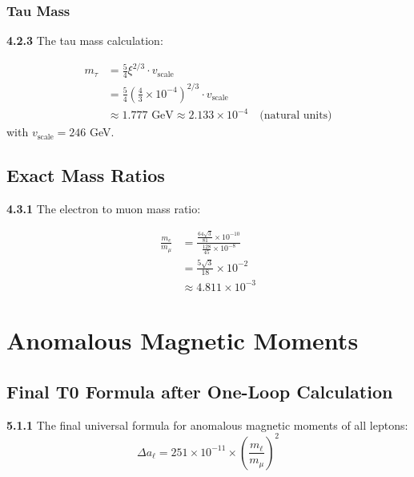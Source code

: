 \documentclass[12pt,a4paper]{article}
\newcommand{\xipar}{\xi}
\begin{document}
	\subsubsection{Tau Mass}
	
	\noindent \textbf{4.2.3} The tau mass calculation:
	\begin{keyresult}
		\begin{align}
			m_\tau &= \frac{5}{4} \xipar^{2/3} \cdot v_{\text{scale}} \\
			&= \frac{5}{4} \left( \frac{4}{3} \times 10^{-4} \right)^{2/3} \cdot v_{\text{scale}} \\
			&\approx 1.777 \text{ GeV} \approx 2.133 \times 10^{-4} \quad \text{(natural units)}
		\end{align}
		with $v_{\text{scale}} = 246$ GeV.
	\end{keyresult}
	
	\subsection{Exact Mass Ratios}
	
	\noindent \textbf{4.3.1} The electron to muon mass ratio:
	\begin{keyresult}
		\begin{align}
			\frac{m_e}{m_\mu} &= \frac{\frac{64 \sqrt{3}}{81} \times 10^{-10}}{\frac{128}{45} \times 10^{-8}} \\
			&= \frac{5 \sqrt{3}}{18} \times 10^{-2} \\
			&\approx 4.811 \times 10^{-3}
		\end{align}
	\end{keyresult}
	


	\section{Anomalous Magnetic Moments}
	
	\subsection{Final T0 Formula after One-Loop Calculation}
	
	\noindent \textbf{5.1.1} The final universal formula for anomalous magnetic moments of all leptons:
	\begin{equation}
		\boxed{\Delta a_\ell = 251 \times 10^{-11} \times \left(\frac{m_\ell}{m_\mu}\right)^2}
	\end{equation}
	
\end{document}
